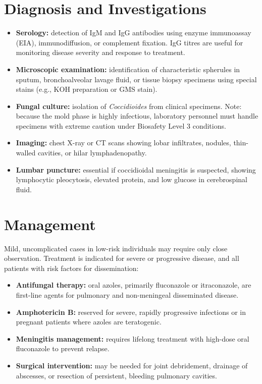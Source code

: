 \section*{Diagnosis and Investigations}
\begin{itemize}
    \item \textbf{Serology:} detection of IgM and IgG antibodies using enzyme immunoassay (EIA), immunodiffusion, or complement fixation. IgG titres are useful for monitoring disease severity and response to treatment.
    \item \textbf{Microscopic examination:} identification of characteristic spherules in sputum, bronchoalveolar lavage fluid, or tissue biopsy specimens using special stains (e.g., KOH preparation or GMS stain).
    \item \textbf{Fungal culture:} isolation of \textit{Coccidioides} from clinical specimens. Note: because the mold phase is highly infectious, laboratory personnel must handle specimens with extreme caution under Biosafety Level 3 conditions.
    \item \textbf{Imaging:} chest X-ray or CT scans showing lobar infiltrates, nodules, thin-walled cavities, or hilar lymphadenopathy.
    \item \textbf{Lumbar puncture:} essential if coccidioidal meningitis is suspected, showing lymphocytic pleocytosis, elevated protein, and low glucose in cerebrospinal fluid.
\end{itemize}

\section*{Management}
Mild, uncomplicated cases in low-risk individuals may require only close observation. Treatment is indicated for severe or progressive disease, and all patients with risk factors for dissemination:

\begin{itemize}
    \item \textbf{Antifungal therapy:} oral azoles, primarily fluconazole or itraconazole, are first-line agents for pulmonary and non-meningeal disseminated disease.
    \item \textbf{Amphotericin B:} reserved for severe, rapidly progressive infections or in pregnant patients where azoles are teratogenic.
    \item \textbf{Meningitis management:} requires lifelong treatment with high-dose oral fluconazole to prevent relapse.
    \item \textbf{Surgical intervention:} may be needed for joint debridement, drainage of abscesses, or resection of persistent, bleeding pulmonary cavities.
\end{itemize}

